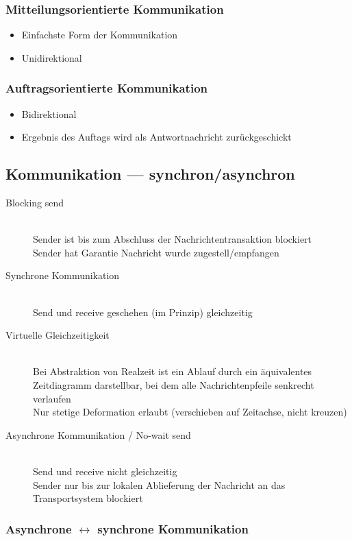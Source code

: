 \documentclass[10pt,a4paper]{article}
\begin{document}
\subsubsection{Mitteilungsorientierte Kommunikation}
\begin{itemize}
\item Einfachste Form der Kommunikation
\item Unidirektional
\end{itemize}

\subsubsection{Auftragsorientierte Kommunikation}
\begin{itemize}
\item Bidirektional
\item Ergebnis des Auftags wird als Antwortnachricht zurückgeschickt
\end{itemize}


\subsection{Kommunikation --- synchron/asynchron}
\begin{description}
\item[Blocking send] \hfill\\ Sender ist bis zum Abschluss der Nachrichtentransaktion blockiert\\Sender hat Garantie Nachricht wurde zugestell/empfangen
\item[Synchrone Kommunikation] \hfill\\ Send und receive geschehen (im Prinzip) gleichzeitig
\item[Virtuelle Gleichzeitigkeit] \hfill\\ Bei Abstraktion von Realzeit ist ein Ablauf durch ein äquivalentes Zeitdiagramm darstellbar, bei dem alle Nachrichtenpfeile senkrecht verlaufen\\Nur stetige Deformation erlaubt (verschieben auf Zeitachse, nicht kreuzen)
\item[Asynchrone Kommunikation / No-wait send] \hfill\\ Send und receive nicht gleichzeitig\\Sender nur bis zur lokalen Ablieferung der Nachricht an das Transportsystem blockiert
\end{description}

\subsubsection{Asynchrone $\leftrightarrow$ synchrone Kommunikation}
\end{document}
